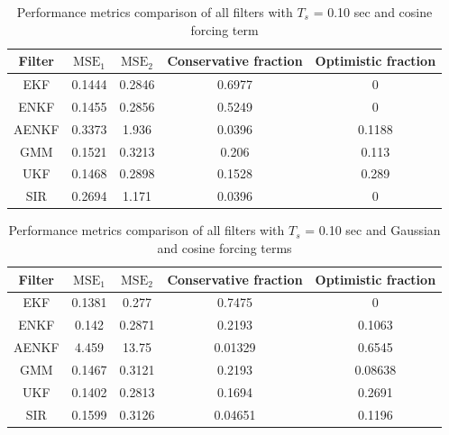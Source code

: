 \documentclass[]{article}
\begin{document}
\begin{table}[h!]
\centering
\begin{tabular}{|c|c|c|c|c|}
\hline
Filter & $\mathrm{MSE}_1$ & $\mathrm{MSE}_2$ & Conservative fraction & Optimistic fraction \\
\hline
EKF &   0.1444 &   0.2846 &   0.6977 &        0 \\
\hline
ENKF &   0.1455 &   0.2856 &   0.5249 &        0 \\
\hline
AENKF &   0.3373 &    1.936 &   0.0396 &   0.1188 \\
\hline
GMM &   0.1521 &   0.3213 &    0.206 &    0.113 \\
\hline
UKF &   0.1468 &   0.2898 &   0.1528 &    0.289 \\
\hline
SIR &   0.2694 &    1.171 &   0.0396 &        0 \\
\hline
\end{tabular}
\caption{Performance metrics comparison of all filters with $T_s$ = 0.10 sec and cosine forcing term}
\label{table:compare_case_2_sample_0}
\end{table}


\begin{table}[h!]
\centering
\begin{tabular}{|c|c|c|c|c|}
\hline
Filter & $\mathrm{MSE}_1$ & $\mathrm{MSE}_2$ & Conservative fraction & Optimistic fraction \\
\hline
EKF &   0.1381 &    0.277 &   0.7475 &        0 \\
\hline
ENKF &    0.142 &   0.2871 &   0.2193 &   0.1063 \\
\hline
AENKF &    4.459 &    13.75 &  0.01329 &   0.6545 \\
\hline
GMM &   0.1467 &   0.3121 &   0.2193 &  0.08638 \\
\hline
UKF &   0.1402 &   0.2813 &   0.1694 &   0.2691 \\
\hline
SIR &   0.1599 &   0.3126 &  0.04651 &   0.1196 \\
\hline
\end{tabular}
\caption{Performance metrics comparison of all filters with $T_s$ = 0.10 sec and Gaussian and cosine forcing terms}
\label{table:compare_case_3_sample_0}
\end{table}
\end{document}
